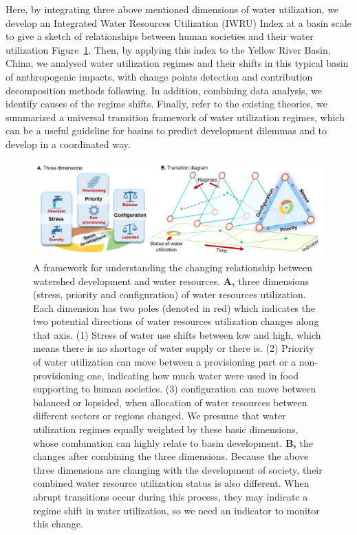 \documentclass[9pt, twocolumn, twoside, lineno]{pnas-new}
\begin{document}
Here, by integrating three above mentioned dimensions of water utilization, we develop an Integrated Water Resources Utilization (IWRU) Index at a basin scale to give a sketch of relationships between human societies and their water utilization Figure~\ref{fig:framework}.
Then, by applying this index to the Yellow River Basin, China, we analysed water utilization regimes and their shifts in this typical basin of anthropogenic impacts, with change points detection and contribution decomposition methods following.
In addition, combining data analysis, we identify causes of the regime shifts. 
Finally, refer to the existing theories, we summarized a universal transition framework of water utilization regimes, which can be a useful guideline for basins to predict development dilemmas and to develop in a coordinated way.


\begin{figure}%
	\centering
	\includegraphics[width=0.9\linewidth]{../../figures/main/framework.jpg}
	\caption{
		A framework for understanding the changing relationship between watershed development and water resources.
		\textbf{A,} three dimensions (stress, priority and configuration) of water resources utilization. Each dimension has two poles (denoted in red) which indicates the two potential directions of water resources utilization changes along that axis. (1) Stress of water use shifts between low and high, which means there is no shortage of water supply or there is. (2) Priority of water utilization can move between a provisioning part or a non-provisioning one, indicating how much water were used in food supporting to human societies. (3) configuration can move between balanced or lopsided, when allocation of water resources between different sectors or regions changed. We presume that water utilization regimes equally weighted by these basic dimensions, whose combination can highly relate to basin development. 
		\textbf{B,} the changes after combining the three dimensions. Because the above three dimensions are changing with the development of society, their combined water resource utilization status is also different. When abrupt transitions occur during this process, they may indicate a regime shift in water utilization, so we need an indicator to monitor this change.
	}
	\label{fig:framework}
\end{figure}
\end{document}
